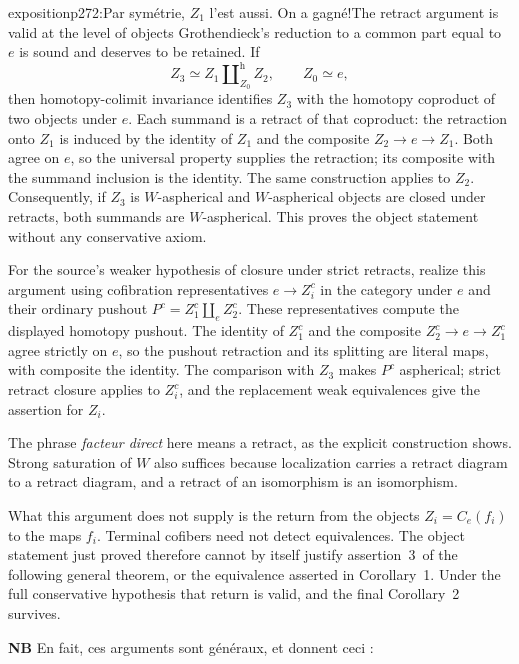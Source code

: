 \begin{dcomment}{exposition}{p272:Par symétrie, $Z_1$ l'est aussi. On a gagné!}{The retract argument is valid at the level of objects}
Grothendieck's reduction to a common part equal to $e$ is sound and deserves to be retained. If
\[
 Z_3\simeq Z_1\amalg^{\mathrm h}_{Z_0}Z_2,
 \qquad Z_0\simeq e,
\]
then homotopy-colimit invariance identifies $Z_3$ with the homotopy coproduct of two objects under $e$. Each summand is a retract of that coproduct: the retraction onto $Z_1$ is induced by the identity of $Z_1$ and the composite $Z_2\to e\to Z_1$. Both agree on $e$, so the universal property supplies the retraction; its composite with the summand inclusion is the identity. The same construction applies to $Z_2$. Consequently, if $Z_3$ is $W$-aspherical and $W$-aspherical objects are closed under retracts, both summands are $W$-aspherical. This proves the object statement without any conservative axiom.

For the source's weaker hypothesis of closure under strict retracts, realize this argument using cofibration representatives $e\to Z_i^c$ in the category under $e$ and their ordinary pushout $P^c=Z_1^c\amalg_e Z_2^c$. These representatives compute the displayed homotopy pushout. The identity of $Z_1^c$ and the composite $Z_2^c\to e\to Z_1^c$ agree strictly on $e$, so the pushout retraction and its splitting are literal maps, with composite the identity. The comparison with $Z_3$ makes $P^c$ aspherical; strict retract closure applies to $Z_i^c$, and the replacement weak equivalences give the assertion for $Z_i$.

The phrase \emph{facteur direct} here means a retract, as the explicit construction shows. Strong saturation of $W$ also suffices because localization carries a retract diagram to a retract diagram, and a retract of an isomorphism is an isomorphism.

What this argument does not supply is the return from the objects $Z_i=C_e(f_i)$ to the maps $f_i$. Terminal cofibers need not detect equivalences. The object statement just proved therefore cannot by itself justify assertion~3\,\textdegree{} of the following general theorem, or the equivalence asserted in Corollary~1. Under the full conservative hypothesis that return is valid, and the final Corollary~2 survives.
\end{dcomment}


\textbf{NB} En fait, ces arguments sont généraux, et donnent ceci :

